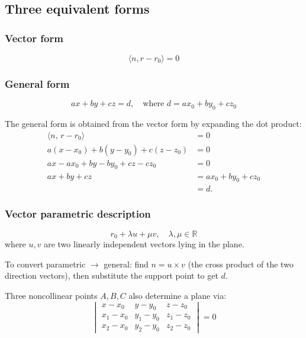 \documentclass[11pt,a4paper]{article}
\theoremstyle{plain}
\theoremstyle{definition}
\theoremstyle{remark}
\newcommand{\R}{\mathbb{R}}
\begin{document}
\subsection{Three equivalent forms}

\subsubsection{Vector form}
\[
\langle n, r - r_0 \rangle = 0
\]

\subsubsection{General form}
\[
ax + by + cz = d, \quad \text{where } d = ax_0 + by_0 + cz_0
\]

The general form is obtained from the vector form by expanding the dot product:
\begin{align*}
\langle n,\, r - r_0 \rangle &= 0 \\
a(x - x_0) + b(y - y_0) + c(z - z_0) &= 0 \\
ax - ax_0 + by - by_0 + cz - cz_0 &= 0 \\
ax + by + cz &= ax_0 + by_0 + cz_0 \\
             &= d.
\end{align*}

\subsubsection{Vector parametric description}
\[
r_0 + \lambda u + \mu v, \quad \lambda, \mu \in \R
\]
where $u, v$ are two linearly independent vectors lying in the plane.

\vspace{\baselineskip}

To convert parametric $\rightarrow$ general: find 
$n = u \times v$ (the cross product of the two direction vectors), then substitute the support point to get $d$.

\vspace{\baselineskip}

Three noncollinear points $A, B, C$ also determine a plane via:
\[
\begin{vmatrix}
x - x_0 & y - y_0 & z - z_0 \\
x_1 - x_0 & y_1 - y_0 & z_1 - z_0 \\
x_2 - x_0 & y_2 - y_0 & z_2 - z_0
\end{vmatrix} = 0
\]

\newpage
\end{document}
